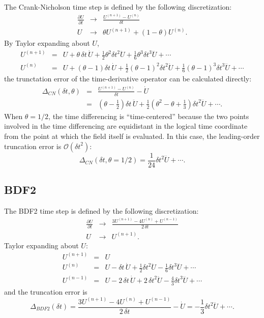 \documentclass[letterpaper]{book}
\newcommand{\dt}{\ensuremath{\delta t}}
\newcommand{\thimp}{\ensuremath{\theta}}
\newcommand{\order}[1]{\ensuremath{\mathcal{O}(#1)}}
\begin{document}
The Crank-Nicholson time step is defined by the following discretization:
\begin{eqnarray*}
  \frac{\partial U}{\partial t} & \to & 
  \frac{U^{(n+1)} - U^{(n)}}{\dt}\\
  U & \to & \thimp U^{(n+1)} + (1-\thimp) U^{(n)}.
\end{eqnarray*}
By Taylor expanding about $U$,
\begin{eqnarray*}
  U^{(n+1)} & = & U + \thimp\,\dt\,\dot{U} + \frac{1}{2} \thimp^2 \dt^2
  \ddot{U} + \frac{1}{6} \thimp^3 \dt^3 \dddot{U}+ \cdots
  \\
  U^{(n)} & = & U + (\thimp-1) \dt\, \dot{U} + \frac{1}{2} (\thimp-1)^2 \dt^2
  \ddot{U} + \frac{1}{6} (\thimp-1)^3 \dt^3 \dddot{U} + \cdots
\end{eqnarray*}
the trunctation error of the time-derivative operator can be
calculated directly:
\begin{eqnarray*}
  \Delta_{CN}(\dt, \thimp) & = & \frac{U^{(n+1)} - U^{(n)}}{\dt} -
 \dot{U}
 \\ 
 & = & 
  \left( \thimp-\frac{1}{2} \right) \dt\,\ddot{U}
  + \frac{1}{2} \left(\thimp^2 - \thimp + \frac{1}{3} \right) \dt^2 \dddot{U}
  + \cdots.
\end{eqnarray*}
When $\thimp=1/2$, the time differencing is ``time-centered'' because
the two points involved in the time differencing are equidistant in
the logical time coordinate from the point at which the field itself
is evaluated.  In this case, the leading-order truncation error is
$\order{\dt^2}$:
\begin{equation}
  \Delta_{CN}(\dt, \thimp=1/2) = \frac{1}{24} \dt^2 \dddot{U} + \cdots.
\end{equation}

\subsection{BDF2}

The BDF2 time step is defined by the following discretization:
\begin{eqnarray*}
  \frac{\partial U}{\partial t} & \to & 
  \frac{3 U^{(n+1)} - 4 U^{(n)} + U^{(n-1)}}{2\,\dt}\\
  U & \to & U^{(n+1)}.
\end{eqnarray*}
Taylor expanding about $U$:
\begin{eqnarray*}
  U^{(n+1)} & = & U
  \\
  U^{(n)} & = & U - \dt\, \dot{U} + \frac{1}{2} \dt^2 \ddot{U} 
  - \frac{1}{6} \dt^3 \dddot{U} + \cdots
  \\
  U^{(n-1)} & = & U - 2\,\dt\, \dot{U} + 2\,\dt^2 \ddot{U} 
  - \frac{4}{3} \dt^3 \dddot{U} + \cdots
\end{eqnarray*}
and the truncation error is
\begin{equation}
  \Delta_{BDF2}(\dt) = 
  \frac{3 U^{(n+1)} - 4 U^{(n)} + U^{(n-1)}}{2\,\dt} - \dot{U} = 
  - \frac{1}{3} \dt^2 \dddot{U}
  + \cdots.
\end{equation}
\end{document}
